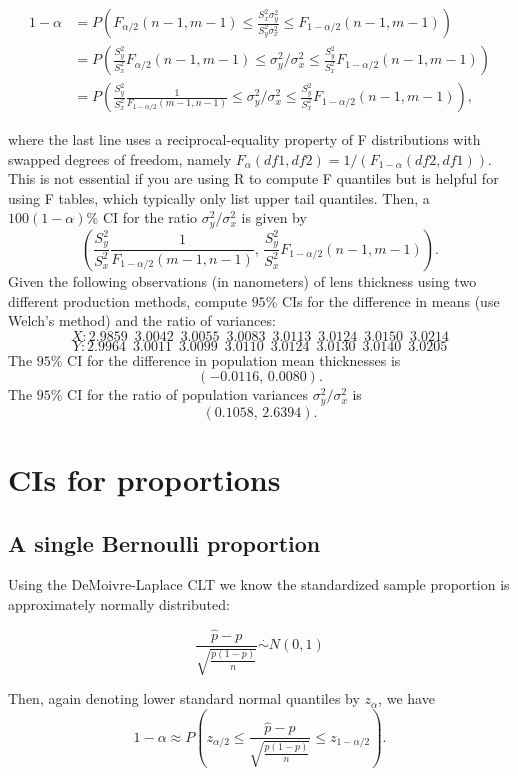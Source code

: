 \documentclass[]{book}
\begin{document}
\begin{align*}
1-\alpha & = P(F_{\alpha/2}(n-1, m-1) \leq \frac{S_x^2 \sigma_y^2}{S_y^2 \sigma_x^2} \leq F_{1-\alpha/2}(n-1, m-1))\\
& = P(\frac{S_y^2}{S_x^2}F_{\alpha/2}(n-1, m-1) \leq \sigma_y^2/\sigma_x^2 \leq \frac{S_y^2}{S_x^2}F_{1-\alpha/2}(n-1, m-1))\\
& = P(\frac{S_y^2}{S_x^2}\frac{1}{F_{1-\alpha/2}(m-1, n-1)} \leq \sigma_y^2/\sigma_x^2 \leq \frac{S_y^2}{S_x^2}F_{1-\alpha/2}(n-1, m-1)),
\end{align*}

where the last line uses a reciprocal-equality property of F
distributions with swapped degrees of freedom, namely
\(F_{\alpha}(df1, df2) = 1/(F_{1-\alpha}(df2, df1))\). This is not
essential if you are using R to compute F quantiles but is helpful for
using F tables, which typically only list upper tail quantiles. Then, a
\(100(1-\alpha)\%\) CI for the ratio \(\sigma_y^2/\sigma_x^2\) is given
by
\[\left(\frac{S_y^2}{S_x^2}\frac{1}{F_{1-\alpha/2}(m-1, n-1)}, \,\frac{S_y^2}{S_x^2}F_{1-\alpha/2}(n-1, m-1)\right).\]
Given the following observations (in nanometers) of lens thickness using
two different production methods, compute \(95\%\) CIs for the
difference in means (use Welch's method) and the ratio of variances:
\[X: 2.9859\,\,\, 3.0042\,\,\, 3.0055 \,\,\,3.0083 \,\,\,3.0113 \,\,\,3.0124\,\,\, 3.0150\,\,\, 3.0214\]
\[Y: 2.9964\,\,\, 3.0011 \,\,\,3.0099\,\,\, 3.0110\,\,\, 3.0124\,\,\, 3.0130\,\,\, 3.0140\,\,\, 3.0205\]
The \(95\%\) CI for the difference in population mean thicknesses is
\[(-0.0116, \, 0.0080).\] The \(95\%\) CI for the ratio of population
variances \(\sigma_y^2/\sigma_x^2\) is \[(0.1058, \, 2.6394).\]

\section{CIs for proportions}\label{cis-for-proportions}

\subsection{A single Bernoulli
proportion}\label{a-single-bernoulli-proportion}

Using the DeMoivre-Laplace CLT we know the standardized sample
proportion is approximately normally distributed:

\[\frac{\hat p - p}{\sqrt{\frac{p(1-p)}{n}}}\stackrel{\cdot}{\sim}N(0,1)\]

Then, again denoting lower standard normal quantiles by \(z_\alpha\), we
have
\[1-\alpha \approx P\left(z_{\alpha/2} \leq \frac{\hat p - p}{\sqrt{\frac{p(1-p)}{n}}}\leq z_{1-\alpha/2}\right).\]
\end{document}

